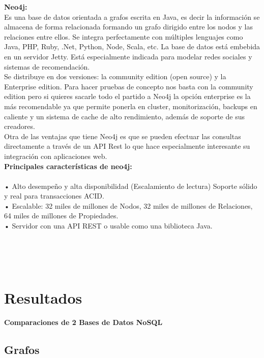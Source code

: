 \documentclass[twoside,onecolumn]{article}
\begin{document}
\begin{flushright}
\begin{itemize}
\textbf{Neo4j:}\\
 Es una base de datos orientada a grafos escrita en Java, es decir la información se almacena de forma relacionada formando un grafo dirigido entre los nodos y las relaciones entre ellos. Se integra perfectamente con múltiples lenguajes como Java, PHP, Ruby, .Net,  Python, Node, Scala, etc. La base de datos está embebida en un servidor Jetty. Está especialmente indicada para modelar redes sociales y sistemas de recomendación.\textbf{}\\
Se distribuye en dos versiones: la community edition (open source) y la Enterprise edition. Para hacer pruebas de concepto nos basta con la community edition pero si quieres sacarle todo el partido a Neo4j la opción enterprise es la más recomendable ya que permite ponerla en cluster, monitorización, backups en caliente y un sistema de cache de alto rendimiento, además de soporte de sus creadores.\textbf{}\\
Otra de las ventajas que tiene Neo4j es que se pueden efectuar las consultas directamente a través de un API Rest lo que hace especialmente interesante su integración con aplicaciones web.
\textbf{}\\
\textbf{Principales características de neo4j:}\\
\textbf{}\\
•	Alto desempeño y alta disponibilidad (Escalamiento de lectura) Soporte sólido y real para transacciones ACID.
\textbf{}\\
•	Escalable: 32 miles de millones de Nodos, 32 miles de millones de Relaciones, 64 miles de millones de Propiedades.
\textbf{}\\
•	Servidor con una API REST o usable como una biblioteca Java.


\textbf{}\\
\textbf{}\\
\textbf{}\\
\section{Resultados}
\textbf{Comparaciones de 2 Bases de Datos NoSQL}\\
\subsection{Grafos}


\textbf{}\\
\textbf{}\\
\textbf{}\\
\textbf{}\\




\end{itemize}
\end{flushright}
\end{document}
